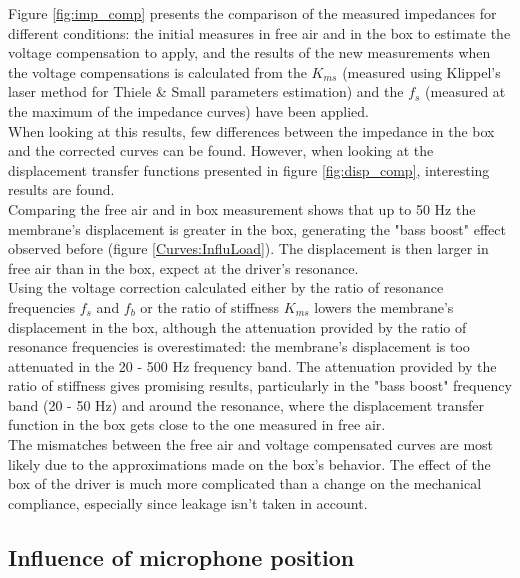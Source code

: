 \documentclass{report}
\begin{document}
Figure \ref{fig:imp_comp} presents the comparison of the measured impedances for different conditions: the initial measures in free air and in the box to estimate the voltage compensation to apply, and the results of the new measurements when the voltage compensations is calculated from the $K_{ms}$ (measured using Klippel's laser method for Thiele \& Small parameters estimation) and the $f_{s}$ (measured at the maximum of the impedance curves) have been applied. \\
When looking at this results, few differences between the impedance in the box and the corrected curves can be found. However, when looking at the displacement transfer functions presented in figure \ref{fig:disp_comp}, interesting results are found. \\

Comparing the free air and in box measurement shows that up to 50 Hz the membrane's displacement is greater in the box, generating the "bass boost" effect observed before (figure \ref{Curves:InfluLoad}). The displacement is then larger in free air than in the box, expect at the driver's resonance.\\
Using the voltage correction calculated either by the ratio of resonance frequencies $f_{s}$ and $f_{b}$ or the ratio of stiffness $K_{ms}$ lowers the membrane's displacement in the box, although the attenuation provided by the ratio of resonance frequencies is overestimated: the membrane's displacement is too attenuated in the 20 - 500 Hz frequency band. The attenuation provided by the ratio of stiffness gives promising results, particularly in the "bass boost" frequency band (20 - 50 Hz) and around the resonance, where the displacement transfer function in the box gets close to the one measured in free air. \\

The mismatches between the free air and voltage compensated curves are most likely due to the approximations made on the box's behavior. The effect of the box of the driver is much more complicated than a change on the mechanical compliance, especially since leakage isn't taken in account.  


\subsection{Influence of microphone position}
\end{document}
